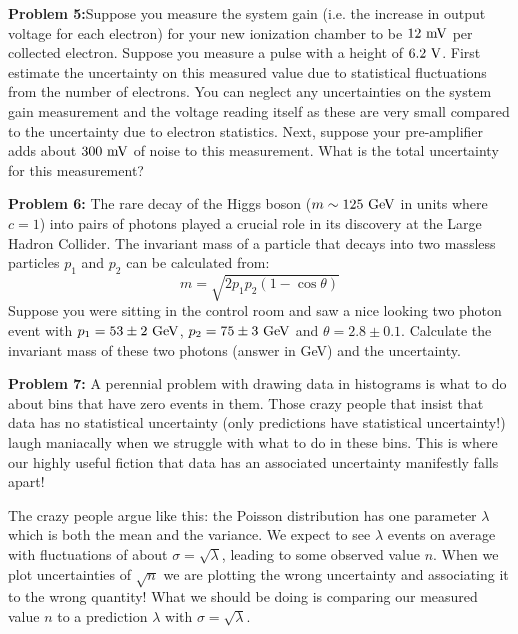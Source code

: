 \documentclass[12pt,oneside]{book}
\begin{document}
\noindent
{\bf Problem 5:}Suppose you measure the system gain (i.e. the increase
in output voltage for each electron) for your new ionization chamber
to be $12~\rm mV$ per collected electron.  Suppose you measure a pulse
with a height of $6.2~\rm V$.  First estimate the uncertainty on this
measured value due to statistical fluctuations from the number of
electrons.  You can neglect any uncertainties on the system gain
measurement and the voltage reading itself as these are very small
compared to the uncertainty due to electron statistics.  Next, suppose
your pre-amplifier adds about $300~\rm mV$ of noise to this
measurement.  What is the total uncertainty for this measurement?
\\ \vskip 0.25cm

\noindent
{\bf Problem 6:}  The rare decay of the Higgs boson ($m \sim125~\rm GeV$ in units where $c=1$) into pairs of photons played a crucial role in its discovery at the Large Hadron Collider.  The invariant mass of a particle that decays into two massless particles $p_1$ and $p_2$ can be calculated from:
\begin{displaymath}
m = \sqrt{2  p_1 p_2 (1 - \cos\theta)}
\end{displaymath}
Suppose you were sitting in the control room and saw a nice looking two photon event with 
$p_1=53 \pm 2~\rm GeV$, $p_2=75 \pm 3~\rm GeV$ and $\theta = 2.8 \pm 0.1$.   Calculate the invariant mass of these two photons (answer in GeV) and the uncertainty. \\ \vskip 0.25cm

\noindent
{\bf Problem 7:} A perennial problem with drawing data in histograms
is what to do about bins that have zero events in them.  Those crazy
people that insist that data has no statistical uncertainty (only
predictions have statistical uncertainty!) laugh maniacally when we
struggle with what to do in these bins.  This is where our highly
useful fiction that data has an associated uncertainty manifestly
falls apart!

The crazy people argue like this: the Poisson distribution has one
parameter $\lambda$ which is both the mean and the variance.  We
expect to see $\lambda$ events on average with fluctuations of about
$\sigma = \sqrt{\lambda}$, leading to some observed value $n$.  When
we plot uncertainties of $\sqrt{n}$ we are plotting the wrong
uncertainty and associating it to the wrong quantity!  What we should
be doing is comparing our measured value $n$ to a prediction $\lambda$
with  $\sigma = \sqrt{\lambda}$.
\end{document}
